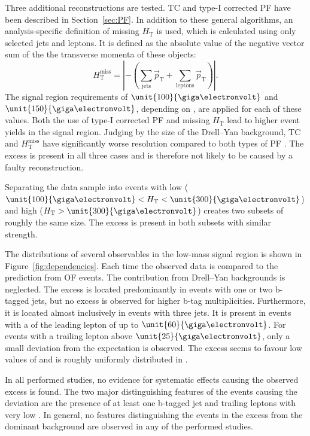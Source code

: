 Three additional \MET reconstructions are tested. TC \MET and type-I corrected PF \MET have been described in Section~\ref{sec:PF}. In addition to these general algorithms, an analysis-specific definition of missing $H_{\mathrm{T}}$ is used, which is calculated using only selected jets and leptons. It is defined as the absolute value of the negative vector sum of the the transverse momenta of these objects: 
\begin{equation*}
H_{\mathrm{T}}^{\mathrm{miss}} = | -(\sum\limits_{\mathrm{jets}}\vec{p}_{\mathrm{T}} + \sum\limits_{\mathrm{leptons}}\vec{p}_{\mathrm{T}}) |.
\end{equation*}
The signal region requirements of $\unit{100}{\giga\electronvolt}$ and $\unit{150}{\giga\electronvolt}$, depending on \njets, are applied for each of these \MET values.  Both the use of type-I corrected PF \MET and missing $H_{\mathrm{T}}$ lead to higher event yields in the signal region. Judging by the size of the Drell--Yan background, TC \MET and $H_{\mathrm{T}}^{\mathrm{miss}}$ have significantly worse \MET resolution compared to both types of PF \MET. The excess is present in all three cases and is therefore not likely to be caused by a faulty \MET reconstruction. 

Separating the data sample into events with low \HT ($\unit{100}{\giga\electronvolt} < \HT <\unit{300}{\giga\electronvolt}$) and high \HT ($\HT > \unit{300}{\giga\electronvolt}$) creates two subsets of roughly the same size. The excess is present in both subsets with similar strength. 
 



The distributions of several observables in the low-mass signal region is shown in Figure~\ref{fig:dependencies}. Each time the observed data is compared to the prediction from OF events. The contribution from Drell--Yan backgrounds is neglected. The excess is located predominantly in events with one or two b-tagged jets, but no excess is observed for higher b-tag multiplicities. Furthermore, it is located almost inclusively in events with three jets. It is present in events with a \pt of the leading lepton of up to $\unit{60}{\giga\electronvolt}$. For events with a trailing lepton \pt above $\unit{25}{\giga\electronvolt}$, only a small deviation from the expectation is observed. The excess seems to favour low values of \MET and is roughly uniformly distributed in \HT. 

In all performed studies, no evidence for systematic effects causing the observed excess is found. The two major distinguishing features of the events causing the deviation are the presence of at least one b-tagged jet and trailing leptons with very low \pt. In general, no features distinguishing the events in the excess from the dominant \ttbar background are observed in any of the performed studies. 

